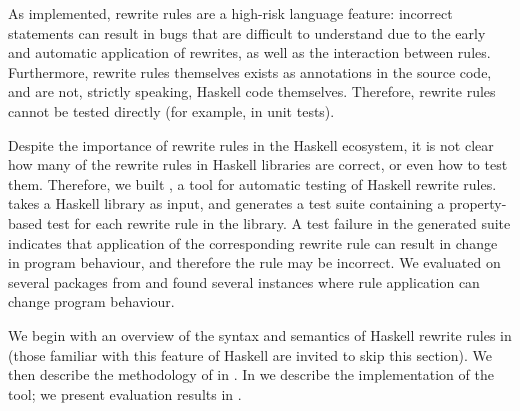 As implemented, rewrite rules are a high-risk language feature: incorrect
statements can result in bugs that are difficult to understand due to the early
and automatic application of rewrites, as well as the interaction between rules.
Furthermore, rewrite rules themselves exists as annotations in the source code,
and are not, strictly speaking, Haskell code themselves. Therefore, rewrite
rules cannot be tested directly (for example, in unit tests).

Despite the importance of rewrite rules in the Haskell ecosystem, it is not
clear how many of the rewrite rules in Haskell libraries are correct, or even
how to test them. Therefore, we built \Rulecheck, a tool for automatic testing
of Haskell rewrite rules. \Rulecheck takes a Haskell library as input, and
generates a test suite containing a property-based test for each rewrite rule in
the library. A test failure in the generated suite indicates that application of
the corresponding rewrite rule can result in change in program behaviour, and
therefore the rule may be incorrect. We evaluated \Rulecheck on several packages
from \Hackage and found several instances where rule application can change
program behaviour.

We begin with an overview of the syntax and semantics of Haskell rewrite rules in
 (those familiar with this feature of Haskell are
invited to skip this section). We then describe the methodology of \Rulecheck in
. In  we describe the implementation
of the tool; we present evaluation results in .
